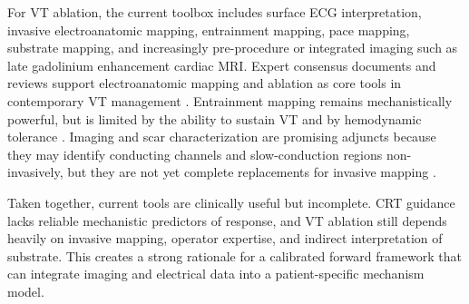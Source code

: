 For VT ablation, the current toolbox includes surface ECG interpretation, invasive electroanatomic mapping, entrainment mapping, pace mapping, substrate mapping, and increasingly pre-procedure or integrated imaging such as late gadolinium enhancement cardiac MRI. Expert consensus documents and reviews support electroanatomic mapping and ablation as core tools in contemporary VT management \cite{pmid31075787,pmid31706471}. Entrainment mapping remains mechanistically powerful, but is limited by the ability to sustain VT and by hemodynamic tolerance \cite{pmid28167086}. Imaging and scar characterization are promising adjuncts because they may identify conducting channels and slow-conduction regions non-invasively, but they are not yet complete replacements for invasive mapping \cite{pmid38262674,pmid36607130}.

Taken together, current tools are clinically useful but incomplete. CRT guidance lacks reliable mechanistic predictors of response, and VT ablation still depends heavily on invasive mapping, operator expertise, and indirect interpretation of substrate. This creates a strong rationale for a calibrated forward framework that can integrate imaging and electrical data into a patient-specific mechanism model.

